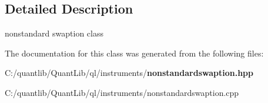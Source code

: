 \subsection{Detailed Description}
nonstandard swaption class 

The documentation for this class was generated from the following files\+:\begin{DoxyCompactItemize}
\item 
C\+:/quantlib/\+Quant\+Lib/ql/instruments/{\bf nonstandardswaption.\+hpp}\item 
C\+:/quantlib/\+Quant\+Lib/ql/instruments/nonstandardswaption.\+cpp\end{DoxyCompactItemize}
